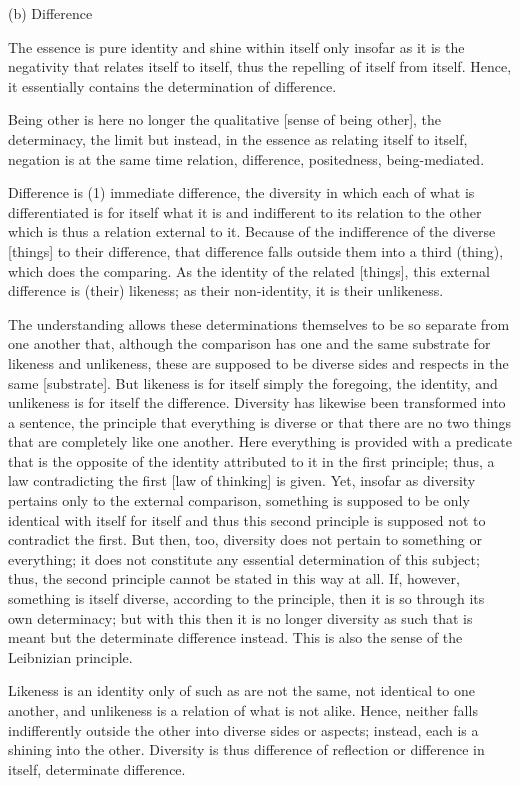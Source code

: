 (b) Difference

The essence is pure identity and shine within itself only insofar
as it is the negativity that relates itself to itself,
thus the repelling of itself from itself.
Hence, it essentially contains the determination of difference.

Being other is here no longer the qualitative [sense of being other],
the determinacy, the limit but instead, in the essence as
relating itself to itself, negation is at the same time relation,
difference, positedness, being-mediated.

Difference is (1) immediate difference,
the diversity in which each of what is differentiated is
for itself what it is and indifferent to its relation to the other
which is thus a relation external to it.
Because of the indifference of the diverse [things] to their difference,
that difference falls outside them into a third (thing), which does the comparing.
As the identity of the related [things],
this external difference is (their) likeness;
as their non-identity, it is their unlikeness.

The understanding allows these determinations themselves to be
so separate from one another that, although the comparison has one
and the same substrate for likeness and unlikeness, these are
supposed to be diverse sides and respects in the same [substrate].
But likeness is for itself simply the foregoing, the identity,
and unlikeness is for itself the difference.
Diversity has likewise been transformed into a sentence,
the principle that everything is diverse or
that there are no two things that are completely like one another.
Here everything is provided with a predicate
that is the opposite of the identity attributed to it
in the first principle;
thus, a law contradicting the first [law of thinking] is given.
Yet, insofar as diversity pertains only to the external comparison,
something is supposed to be only identical with itself for itself
and thus this second principle is supposed not to contradict the first.
But then, too, diversity does not pertain to something or everything;
it does not constitute any essential determination of this subject;
thus, the second principle cannot be stated in this way at all.
If, however, something is itself diverse, according to the principle,
then it is so through its own determinacy;
but with this then it is no longer diversity as such that is meant
but the determinate difference instead.
This is also the sense of the Leibnizian principle.

Likeness is an identity only of such as are
not the same, not identical to one another, and
unlikeness is a relation of what is not alike.
Hence, neither falls indifferently outside the other
into diverse sides or aspects;
instead, each is a shining into the other.
Diversity is thus difference of reflection or
difference in itself, determinate difference.

